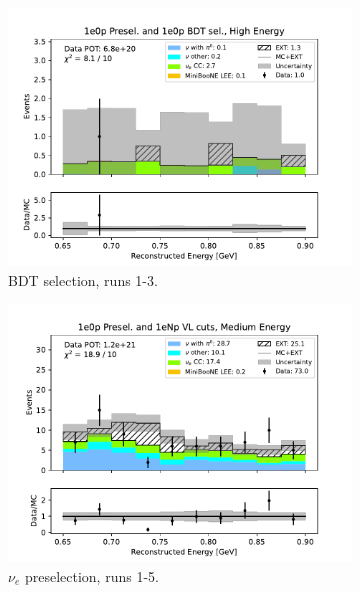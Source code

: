 \begin{figure}[H]
\begin{subfigure}{0.33\linewidth}
        \includegraphics[width=\linewidth]{technote/Sidebands/Figures/NearSideband/near_sideband_reco_e_run123_ZP_ZPBDT_MEDIUM_ENERGY.pdf}
        \caption{BDT selection, runs 1-3.}
    \end{subfigure}
    \begin{subfigure}{0.33\linewidth}
        \includegraphics[width=\linewidth]{technote/Sidebands/Figures/NearSideband/near_sideband_reco_e_run1234a4b4c4d5_ZP_ZP_MEDIUM_ENERGY.pdf}
        \caption{$\nu_e$ preselection, runs 1-5.}
    \end{subfigure}%
    \begin{subfigure}{0.33\linewidth}

\end{subfigure}
\end{figure}
